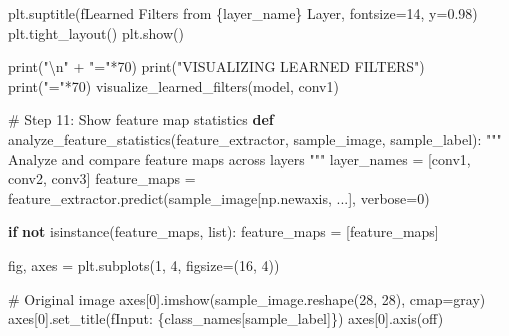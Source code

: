 \documentclass[
  letterpaper,
  DIV=11,
  numbers=noendperiod]{scrreprt}
\newenvironment{Shaded}{\begin{snugshade}}{\end{snugshade}}
\newcommand{\BuiltInTok}[1]{\textcolor[rgb]{0.00,0.23,0.31}{#1}}
\newcommand{\CharTok}[1]{\textcolor[rgb]{0.13,0.47,0.30}{#1}}
\newcommand{\CommentTok}[1]{\textcolor[rgb]{0.37,0.37,0.37}{#1}}
\newcommand{\ControlFlowTok}[1]{\textcolor[rgb]{0.00,0.23,0.31}{\textbf{#1}}}
\newcommand{\DecValTok}[1]{\textcolor[rgb]{0.68,0.00,0.00}{#1}}
\newcommand{\FloatTok}[1]{\textcolor[rgb]{0.68,0.00,0.00}{#1}}
\newcommand{\KeywordTok}[1]{\textcolor[rgb]{0.00,0.23,0.31}{\textbf{#1}}}
\newcommand{\NormalTok}[1]{\textcolor[rgb]{0.00,0.23,0.31}{#1}}
\newcommand{\OperatorTok}[1]{\textcolor[rgb]{0.37,0.37,0.37}{#1}}
\newcommand{\SpecialCharTok}[1]{\textcolor[rgb]{0.37,0.37,0.37}{#1}}
\newcommand{\SpecialStringTok}[1]{\textcolor[rgb]{0.13,0.47,0.30}{#1}}
\newcommand{\StringTok}[1]{\textcolor[rgb]{0.13,0.47,0.30}{#1}}
\begin{document}
\begin{Shaded}
\begin{Highlighting}[]
\NormalTok{    plt.suptitle(}\SpecialStringTok{f\textquotesingle{}Learned Filters from }\SpecialCharTok{\{}\NormalTok{layer\_name}\SpecialCharTok{\}}\SpecialStringTok{ Layer\textquotesingle{}}\NormalTok{, fontsize}\OperatorTok{=}\DecValTok{14}\NormalTok{, y}\OperatorTok{=}\FloatTok{0.98}\NormalTok{)}
\NormalTok{    plt.tight\_layout()}
\NormalTok{    plt.show()}

\BuiltInTok{print}\NormalTok{(}\StringTok{"}\CharTok{\textbackslash{}n}\StringTok{"} \OperatorTok{+} \StringTok{"="}\OperatorTok{*}\DecValTok{70}\NormalTok{)}
\BuiltInTok{print}\NormalTok{(}\StringTok{"VISUALIZING LEARNED FILTERS"}\NormalTok{)}
\BuiltInTok{print}\NormalTok{(}\StringTok{"="}\OperatorTok{*}\DecValTok{70}\NormalTok{)}
\NormalTok{visualize\_learned\_filters(model, }\StringTok{\textquotesingle{}conv1\textquotesingle{}}\NormalTok{)}

\CommentTok{\# Step 11: Show feature map statistics}
\KeywordTok{def}\NormalTok{ analyze\_feature\_statistics(feature\_extractor, sample\_image, sample\_label):}
    \CommentTok{"""}
\CommentTok{    Analyze and compare feature maps across layers}
\CommentTok{    """}
\NormalTok{    layer\_names }\OperatorTok{=}\NormalTok{ [}\StringTok{\textquotesingle{}conv1\textquotesingle{}}\NormalTok{, }\StringTok{\textquotesingle{}conv2\textquotesingle{}}\NormalTok{, }\StringTok{\textquotesingle{}conv3\textquotesingle{}}\NormalTok{]}
\NormalTok{    feature\_maps }\OperatorTok{=}\NormalTok{ feature\_extractor.predict(sample\_image[np.newaxis, ...], verbose}\OperatorTok{=}\DecValTok{0}\NormalTok{)}
    
    \ControlFlowTok{if} \KeywordTok{not} \BuiltInTok{isinstance}\NormalTok{(feature\_maps, }\BuiltInTok{list}\NormalTok{):}
\NormalTok{        feature\_maps }\OperatorTok{=}\NormalTok{ [feature\_maps]}
    
\NormalTok{    fig, axes }\OperatorTok{=}\NormalTok{ plt.subplots(}\DecValTok{1}\NormalTok{, }\DecValTok{4}\NormalTok{, figsize}\OperatorTok{=}\NormalTok{(}\DecValTok{16}\NormalTok{, }\DecValTok{4}\NormalTok{))}
    
    \CommentTok{\# Original image}
\NormalTok{    axes[}\DecValTok{0}\NormalTok{].imshow(sample\_image.reshape(}\DecValTok{28}\NormalTok{, }\DecValTok{28}\NormalTok{), cmap}\OperatorTok{=}\StringTok{\textquotesingle{}gray\textquotesingle{}}\NormalTok{)}
\NormalTok{    axes[}\DecValTok{0}\NormalTok{].set\_title(}\SpecialStringTok{f\textquotesingle{}Input: }\SpecialCharTok{\{}\NormalTok{class\_names[sample\_label]}\SpecialCharTok{\}}\SpecialStringTok{\textquotesingle{}}\NormalTok{)}
\NormalTok{    axes[}\DecValTok{0}\NormalTok{].axis(}\StringTok{\textquotesingle{}off\textquotesingle{}}\NormalTok{)}
    

\end{Highlighting}
\end{Shaded}
\end{document}
